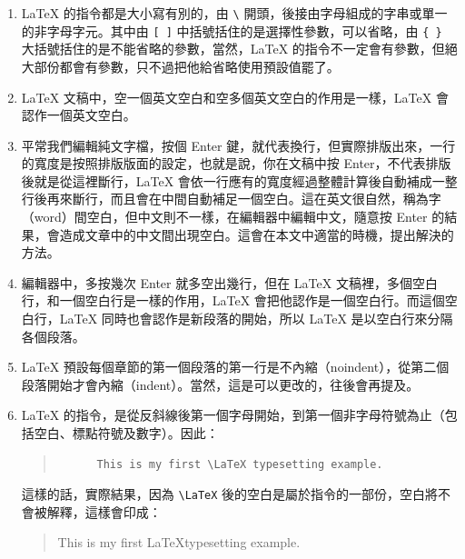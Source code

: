 \begin{enumerate}

   \item \LaTeX{} 的指令都是大小寫有別的，由 \verb|\| 開頭，後接由字母組成的字串或單一的非字母字元。其中由 \verb|[ ]| 中括號括住的是選擇性參數，可以省略，由 \verb|{ }| 大括號括住的是不能省略的參數，當然，\LaTeX{} 的指令不一定會有參數，但絕大部份都會有參數，只不過把他給省略使用預設值罷了。

   \item \LaTeX{} 文稿中，空一個英文空白和空多個英文空白的作用是一樣，\LaTeX{} 會認作一個英文空白。

   \item 平常我們編輯純文字檔，按個 \textsf{Enter} 鍵，就代表換行，但實際排版出來，一行的寬度是按照排版版面的設定，也就是說，你在文稿中按 \textsf{Enter}，不代表排版後就是從這裡斷行，\LaTeX{} 會依一行應有的寬度經過整體計算後自動補成一整行後再來斷行，而且會在中間自動補足一個空白。這在英文很自然，稱為字（word）間空白，但中文則不一樣，在編輯器中編輯中文，隨意按 \textsf{Enter} 的結果，會造成文章中的中文間出現空白。這會在本文中適當的時機，提出解決的方法。

   \item 編輯器中，多按幾次 \textsf{Enter} 就多空出幾行，但在 \LaTeX{} 文稿裡，多個空白行，和一個空白行是一樣的作用，\LaTeX{} 會把他認作是一個空白行。而這個空白行，\LaTeX{} 同時也會認作是新段落的開始，所以 \LaTeX{} 是以空白行來分隔各個段落。

   \item \LaTeX{} 預設每個章節的第一個段落的第一行是不內縮（noindent），從第二個段落開始才會內縮（indent）。當然，這是可以更改的，往後會再提及。

   \item \LaTeX{} 的指令，是從反斜線後第一個字母開始，到第一個非字母符號為止（包括空白、標點符號及數字）。因此：

         \begin{quote}
            \begin{verbatim}
      This is my first \LaTeX typesetting example.
    \end{verbatim}
         \end{quote}

         這樣的話，實際結果，因為 \verb|\LaTeX| 後的空白是屬於指令的一部份，空白將不會被解釋，這樣會印成：

         \begin{quote}
            This is my first \LaTeX typesetting example.
         \end{quote}


\end{enumerate}
